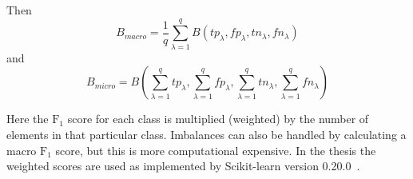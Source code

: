 Then~\citep{van2013macro}
\[
    B_{macro} = \frac{1}{q} \sum_{\lambda=1}^q B(tp_\lambda, fp_\lambda, tn_\lambda, fn_\lambda)
\]
and~\citep{van2013macro}
\[
    B_{micro} = B \left( \sum_{\lambda=1}^q tp_\lambda, \sum_{\lambda=1}^q fp_\lambda, \sum_{\lambda=1}^q tn_\lambda, \sum_{\lambda=1}^q fn_\lambda \right)
\]

Here the $\text{F}_1$ score for each class is multiplied (weighted) by the number of elements in that particular class.
Imbalances can also be handled by calculating a macro $\text{F}_1$ score, but this is more computational expensive.
\fi
In the thesis the weighted \fone scores are used as implemented by Scikit-learn version 0.20.0~\citep{scikit2018classification}.